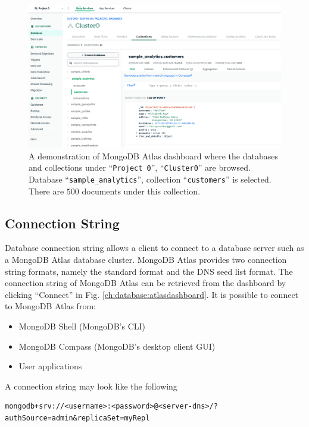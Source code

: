 \begin{figure}[htbp]
	\centering
	\includegraphics[width=\textwidth]{chapters/part-3/figures/atlas_dashboard_2.png}
	\caption{A demonstration of MongoDB Atlas dashboard where the databases and collections under ``\texttt{Project 0}'', ``\texttt{Cluster0}'' are browsed. Database ``\texttt{sample\_analytics}'', collection ``\texttt{customers}'' is selected. There are $500$ documents under this collection.} \label{ch:database:atlasdashboard2}
\end{figure}

\subsection{Connection String}

Database connection string allows a client to connect to a database server such as a MongoDB Atlas database cluster. MongoDB Atlas provides two connection string formats, namely the standard format and the DNS seed list format. The connection string of MongoDB Atlas can be retrieved from the dashboard by clicking ``Connect'' in Fig. \ref{ch:database:atlasdashboard}. It is possible to connect to MongoDB Atlas from:
\begin{itemize}
  \item MongoDB Shell (MongoDB's CLI)
  \item MongoDB Compass (MongoDB's desktop client GUI)
  \item User applications
\end{itemize}

A connection string may look like the following
\begin{lstlisting}
mongodb+srv://<username>:<password>@<server-dns>/?authSource=admin&replicaSet=myRepl
\end{lstlisting}




























